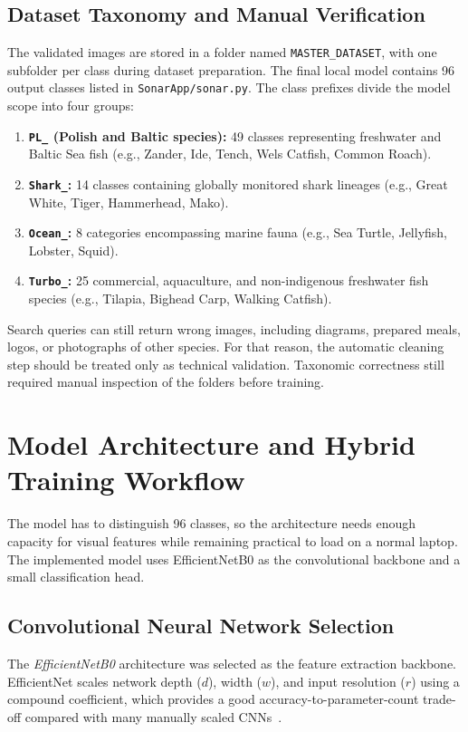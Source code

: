 \documentclass[11pt,a4paper,oneside]{article}
\begin{document}
\subsection{Dataset Taxonomy and Manual Verification}
The validated images are stored in a folder named \texttt{MASTER\_DATASET}, with one subfolder per class during dataset preparation. The final local model contains 96 output classes listed in \texttt{SonarApp/sonar.py}. The class prefixes divide the model scope into four groups:
\begin{enumerate}
    \item \textbf{\texttt{PL\_} (Polish and Baltic species):} 49 classes representing freshwater and Baltic Sea fish (e.g., Zander, Ide, Tench, Wels Catfish, Common Roach).
    \item \textbf{\texttt{Shark\_}:} 14 classes containing globally monitored shark lineages (e.g., Great White, Tiger, Hammerhead, Mako).
    \item \textbf{\texttt{Ocean\_}:} 8 categories encompassing marine fauna (e.g., Sea Turtle, Jellyfish, Lobster, Squid).
    \item \textbf{\texttt{Turbo\_}:} 25 commercial, aquaculture, and non-indigenous freshwater fish species (e.g., Tilapia, Bighead Carp, Walking Catfish).
\end{enumerate}

Search queries can still return wrong images, including diagrams, prepared meals, logos, or photographs of other species. For that reason, the automatic cleaning step should be treated only as technical validation. Taxonomic correctness still required manual inspection of the folders before training.

\section{Model Architecture and Hybrid Training Workflow}
\label{sec:architecture}

The model has to distinguish 96 classes, so the architecture needs enough capacity for visual features while remaining practical to load on a normal laptop. The implemented model uses EfficientNetB0 as the convolutional backbone and a small classification head.

\subsection{Convolutional Neural Network Selection}
The \textit{EfficientNetB0} architecture was selected as the feature extraction backbone. EfficientNet scales network depth ($d$), width ($w$), and input resolution ($r$) using a compound coefficient, which provides a good accuracy-to-parameter-count trade-off compared with many manually scaled CNNs~\cite{efficientnet}.
\end{document}
